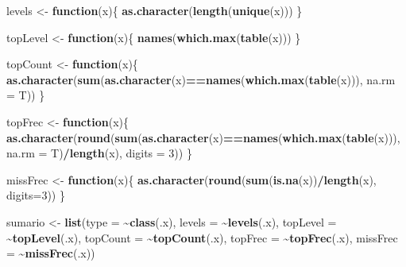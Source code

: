 \documentclass[notspecified,article,submit,moreauthors,pdftex]{Definitions/mdpi}
\newenvironment{Shaded}{\begin{snugshade}}{\end{snugshade}}
\newcommand{\AttributeTok}[1]{\textcolor[rgb]{0.13,0.29,0.53}{#1}}
\newcommand{\ControlFlowTok}[1]{\textcolor[rgb]{0.13,0.29,0.53}{\textbf{#1}}}
\newcommand{\DecValTok}[1]{\textcolor[rgb]{0.00,0.00,0.81}{#1}}
\newcommand{\FunctionTok}[1]{\textcolor[rgb]{0.13,0.29,0.53}{\textbf{#1}}}
\newcommand{\NormalTok}[1]{#1}
\newcommand{\OtherTok}[1]{\textcolor[rgb]{0.56,0.35,0.01}{#1}}
\newcommand{\SpecialCharTok}[1]{\textcolor[rgb]{0.81,0.36,0.00}{\textbf{#1}}}
\begin{document}
\begin{Shaded}
\begin{Highlighting}[]
\NormalTok{levels }\OtherTok{\textless{}{-}} \ControlFlowTok{function}\NormalTok{(x)\{}
  \FunctionTok{as.character}\NormalTok{(}\FunctionTok{length}\NormalTok{(}\FunctionTok{unique}\NormalTok{(x)))}
\NormalTok{\}}

\NormalTok{topLevel }\OtherTok{\textless{}{-}} \ControlFlowTok{function}\NormalTok{(x)\{}
  \FunctionTok{names}\NormalTok{(}\FunctionTok{which.max}\NormalTok{(}\FunctionTok{table}\NormalTok{(x)))}
\NormalTok{\}}

\NormalTok{topCount }\OtherTok{\textless{}{-}} \ControlFlowTok{function}\NormalTok{(x)\{}
  \FunctionTok{as.character}\NormalTok{(}\FunctionTok{sum}\NormalTok{(}\FunctionTok{as.character}\NormalTok{(x)}\SpecialCharTok{==}\FunctionTok{names}\NormalTok{(}\FunctionTok{which.max}\NormalTok{(}\FunctionTok{table}\NormalTok{(x))), }\AttributeTok{na.rm =}\NormalTok{ T))}
\NormalTok{\}}

\NormalTok{topFrec }\OtherTok{\textless{}{-}} \ControlFlowTok{function}\NormalTok{(x)\{}
  \FunctionTok{as.character}\NormalTok{(}\FunctionTok{round}\NormalTok{(}\FunctionTok{sum}\NormalTok{(}\FunctionTok{as.character}\NormalTok{(x)}\SpecialCharTok{==}\FunctionTok{names}\NormalTok{(}\FunctionTok{which.max}\NormalTok{(}\FunctionTok{table}\NormalTok{(x))), }\AttributeTok{na.rm =}\NormalTok{ T)}\SpecialCharTok{/}\FunctionTok{length}\NormalTok{(x), }\AttributeTok{digits =} \DecValTok{3}\NormalTok{))}
\NormalTok{\}}

\NormalTok{missFrec }\OtherTok{\textless{}{-}} \ControlFlowTok{function}\NormalTok{(x)\{}
  \FunctionTok{as.character}\NormalTok{(}\FunctionTok{round}\NormalTok{(}\FunctionTok{sum}\NormalTok{(}\FunctionTok{is.na}\NormalTok{(x))}\SpecialCharTok{/}\FunctionTok{length}\NormalTok{(x), }\AttributeTok{digits=}\DecValTok{3}\NormalTok{))}
\NormalTok{\}}

\NormalTok{sumario }\OtherTok{\textless{}{-}} \FunctionTok{list}\NormalTok{(}\AttributeTok{type =} \SpecialCharTok{\textasciitilde{}}\FunctionTok{class}\NormalTok{(.x), }\AttributeTok{levels =} \SpecialCharTok{\textasciitilde{}}\FunctionTok{levels}\NormalTok{(.x), }\AttributeTok{topLevel =} \SpecialCharTok{\textasciitilde{}}\FunctionTok{topLevel}\NormalTok{(.x), }\AttributeTok{topCount =} \SpecialCharTok{\textasciitilde{}}\FunctionTok{topCount}\NormalTok{(.x), }\AttributeTok{topFrec =} \SpecialCharTok{\textasciitilde{}}\FunctionTok{topFrec}\NormalTok{(.x), }\AttributeTok{missFrec =} \SpecialCharTok{\textasciitilde{}}\FunctionTok{missFrec}\NormalTok{(.x))}


\end{Highlighting}
\end{Shaded}
\end{document}
